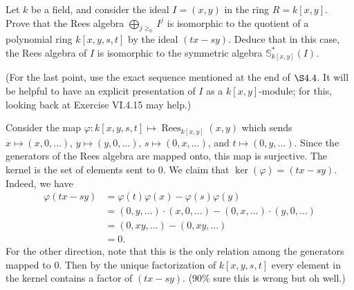 \documentclass[../../master.tex]{subfiles}
\DeclareMathOperator{\Rees}{Rees}
\begin{document}
\begin{problem}
    Let $k$ be a field, and consider the ideal $I = (x, y)$ in the ring $R = k[x, y]$.
    Prove that the Rees algebra $\bigoplus_{j \geq_0} I^{j}$ is isomorphic to the quotient of a polynomial ring $k[x, y, s, t]$ by the ideal $(tx - sy)$.
    Deduce that in this case, the Rees algebra of $I$ is isomorphic to the symmetric algebra $\mathbb{S}_{k[x, y]}^{*}(I)$.

    (For the last point, use the exact sequence mentioned at the end of $\S 4.4$.
    It will be helpful to have an explicit presentation of $I$ as a $k[x, y]$-module;
    for this, looking back at Exercise VI.4.15 may help.)
\end{problem}

\begin{solution}
    Consider the map $\varphi:k[x, y, s, t] \mapsto \Rees_{k[x,y]}(x, y)$ which sends $x \mapsto (x, 0, \ldots)$, $y \mapsto (y, 0, \ldots)$, $s \mapsto (0, x, \ldots)$, and $t \mapsto (0, y, \ldots)$.
    Since the generators of the Rees algebra are mapped onto, this map is surjective.
    The kernel is the set of elements sent to 0.
    We claim that $\ker(\varphi) = (tx - sy)$.
    Indeed, we have
    \begin{align*}
        \varphi(tx - sy) &= \varphi(t) \varphi(x) - \varphi(s) \varphi(y) \\
                         &= (0, y, \ldots) \cdot (x, 0, \ldots) - (0, x, \ldots) \cdot (y, 0, \ldots) \\
                         &= (0, xy, \ldots) - (0, xy, \ldots) \\
                         &= 0.
    \end{align*}
    For the other direction, note that this is the only relation among the generators mapped to 0.
    Then by the unique factorization of $k[x, y, s, t]$ every element in the kernel contains a factor of $(tx - sy)$.
    (90\% sure this is wrong but oh well.)


\end{solution}
\end{document}
